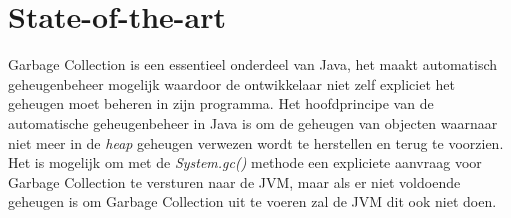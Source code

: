 






\section{State-of-the-art}%
\label{sec:state-of-the-art}

Garbage Collection is een essentieel onderdeel van Java, het maakt automatisch geheugenbeheer mogelijk waardoor de ontwikkelaar niet zelf expliciet het geheugen moet beheren in zijn programma.
Het hoofdprincipe van de automatische geheugenbeheer in Java is om de geheugen van objecten waarnaar niet meer in de \textit{heap} geheugen verwezen wordt te herstellen en terug te voorzien.
Het is mogelijk om met de \textit{System.gc()} methode een expliciete aanvraag voor Garbage Collection te versturen naar de JVM, maar als er niet voldoende geheugen is om Garbage Collection uit te voeren zal de JVM dit ook niet doen.


